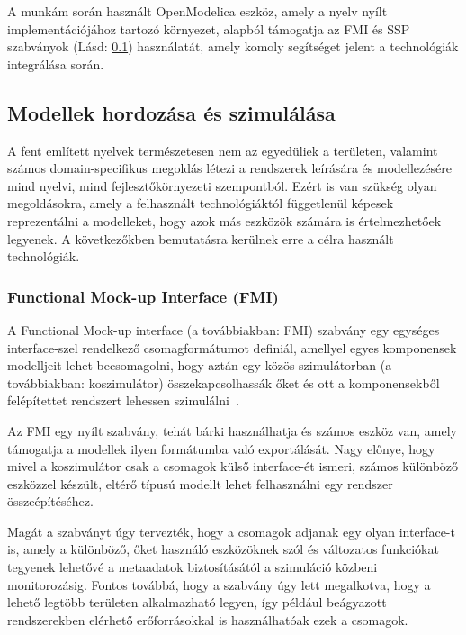         A munkám során használt OpenModelica eszköz, amely a nyelv nyílt implementációjához tartozó
        környezet, alapból támogatja az FMI és SSP szabványok (Lásd: \ref{sec:ModellHord}) használatát, amely komoly segítséget jelent a technológiák
        integrálása során.

    \subsection{Modellek hordozása és szimulálása} \label{sec:ModellHord}
    A fent említett nyelvek természetesen nem az egyedüliek a területen, valamint számos domain-specifikus megoldás létezi a rendszerek leírására és modellezésére mind nyelvi, mind fejlesztőkörnyezeti szempontból.
    Ezért is van szükség olyan megoldásokra, amely a felhasznált technológiáktól függetlenül képesek reprezentálni a modelleket, hogy azok más eszközök számára is értelmezhetőek legyenek. A következőkben bemutatásra kerülnek erre a célra használt technológiák.
    
        \subsubsection{Functional Mock-up Interface (FMI)} \label{sec:fmi}
        A Functional Mock-up interface (a továbbiakban: FMI) szabvány egy egységes interface-szel
        rendelkező csomagformátumot definiál, amellyel egyes komponensek modelljeit lehet becsomagolni,
        hogy aztán egy közös szimulátorban (a továbbiakban: koszimulátor) összekapcsolhassák őket és ott a komponensekből felépítettet
        rendszert lehessen szimulálni~\cite{FMI2023}.
        
        Az FMI egy nyílt szabvány, tehát bárki használhatja és számos eszköz van,
        amely támogatja a modellek ilyen formátumba való exportálását. Nagy előnye, hogy mivel a koszimulátor
        csak a csomagok külső interface-ét ismeri,
        számos különböző eszközzel készült, eltérő típusú modellt lehet felhasználni egy rendszer összeépítéséhez.
        
        Magát a szabványt úgy tervezték, hogy a csomagok adjanak egy olyan interface-t is,
        amely a különböző, őket használó eszközöknek szól és változatos funkciókat tegyenek lehetővé a
        metaadatok biztosításától a szimuláció közbeni monitorozásig. Fontos továbbá, hogy a szabvány úgy
        lett megalkotva, hogy a lehető legtöbb területen alkalmazható legyen, így például beágyazott
        rendszerekben elérhető erőforrásokkal is használhatóak ezek a csomagok.

